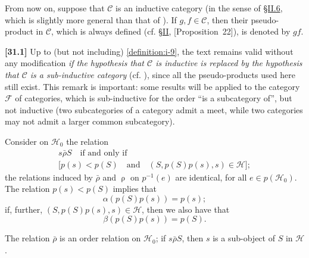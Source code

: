 \documentclass[a4paper,fleqn]{article}
\theoremstyle{plain}
\newenvironment{proposition}[1]
  {\renewcommand\theinnerproposition{#1}\innerproposition}
  {\endinnerproposition}
\theoremstyle{definition}
\newenvironment{longcomm}[1]
  {\noindent\textbf{[#1]}\rmfamily}
  {}
\newcommand{\textand}{\quad\text{and}\quad}
\newcommand{\CC}{\mathcal{C}}
\newcommand{\HH}{\mathcal{H}}
\newcommand{\FF}{\mathcal{F}}
\newcommand{\relrho}{\mathrel{\rho}}
\newcommand{\relrhobar}{\mathrel{\bar{\rho}}}
\begin{document}
From now on, suppose that $\CC$ is an inductive category (in the sense of \hyperref[section:ii.6]{§II.6}, which is slightly more general than that of \cite{3c}).
If $g,f\in\CC$, then their pseudo-product in $\CC$, which is always defined (cf. \hyperref[section:ii]{§II}, \hyperref[proposition:i-22][Proposition~22]), is denoted by $gf$.

\begin{longcomm}{31.1}
  Up to (but not including) \cref{definition:i-9}, the text remains valid without any modification \emph{if the hypothesis that $\CC$ is inductive is replaced by the hypothesis that $\CC$ is a sub-inductive category} (cf. \cite{coll69}), since all the pseudo-products used here still exist.
  This remark is important: some results will be applied to the category $\FF$ of categories, which is sub-inductive for the order ``is a subcategory of'', but not inductive (two subcategories of a category admit a meet, while two categories may not admit a larger common subcategory).
\end{longcomm}

Consider on $\HH_0$ the relation
\[
  \begin{gathered}
    s\relrhobar S
    \quad\text{if and only if}\quad
  \\\big[p(s)<p(S)
    \textand
    (S,p(S)p(s),s)\in\HH\big];
  \end{gathered}
\]
the relations induced by $\relrhobar$ and $\relrho$ on $p^{-1}(e)$ are identical, for all $e\in p(\HH_0)$.
The relation $p(s)<p(S)$ implies that
\[
  \alpha(p(S)p(s))
  = p(s);
\]
if, further, $(S,p(S)p(s),s)\in\HH$, then we also have that
\[
  \beta(p(S)p(s))
  = p(S).
\]

\begin{proposition}{3}
\label{proposition:i-3}
  The relation $\relrhobar$ is an order relation on $\HH_0$;
  if $s\relrhobar S$, then $s$ is a sub-object \cite{5} of $S$ in $\HH$.
\end{proposition}
\end{document}

